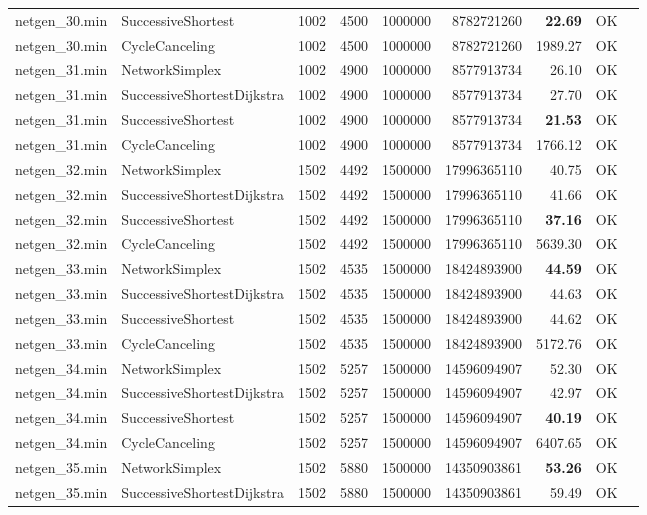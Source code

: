 \begin{longtable}{llrrrrrrl}
netgen\_30.min & SuccessiveShortest & 1002 & 4500 & 1000000 & 8782721260 & \textbf{22.69} & OK \\
netgen\_30.min & CycleCanceling & 1002 & 4500 & 1000000 & 8782721260 & 1989.27 & OK \\
\midrule
netgen\_31.min & NetworkSimplex & 1002 & 4900 & 1000000 & 8577913734 & 26.10 & OK \\
netgen\_31.min & SuccessiveShortestDijkstra & 1002 & 4900 & 1000000 & 8577913734 & 27.70 & OK \\
netgen\_31.min & SuccessiveShortest & 1002 & 4900 & 1000000 & 8577913734 & \textbf{21.53} & OK \\
netgen\_31.min & CycleCanceling & 1002 & 4900 & 1000000 & 8577913734 & 1766.12 & OK \\
\midrule
netgen\_32.min & NetworkSimplex & 1502 & 4492 & 1500000 & 17996365110 & 40.75 & OK \\
netgen\_32.min & SuccessiveShortestDijkstra & 1502 & 4492 & 1500000 & 17996365110 & 41.66 & OK \\
netgen\_32.min & SuccessiveShortest & 1502 & 4492 & 1500000 & 17996365110 & \textbf{37.16} & OK \\
netgen\_32.min & CycleCanceling & 1502 & 4492 & 1500000 & 17996365110 & 5639.30 & OK \\
\midrule
netgen\_33.min & NetworkSimplex & 1502 & 4535 & 1500000 & 18424893900 & \textbf{44.59} & OK \\
netgen\_33.min & SuccessiveShortestDijkstra & 1502 & 4535 & 1500000 & 18424893900 & 44.63 & OK \\
netgen\_33.min & SuccessiveShortest & 1502 & 4535 & 1500000 & 18424893900 & 44.62 & OK \\
netgen\_33.min & CycleCanceling & 1502 & 4535 & 1500000 & 18424893900 & 5172.76 & OK \\
\midrule
netgen\_34.min & NetworkSimplex & 1502 & 5257 & 1500000 & 14596094907 & 52.30 & OK \\
netgen\_34.min & SuccessiveShortestDijkstra & 1502 & 5257 & 1500000 & 14596094907 & 42.97 & OK \\
netgen\_34.min & SuccessiveShortest & 1502 & 5257 & 1500000 & 14596094907 & \textbf{40.19} & OK \\
netgen\_34.min & CycleCanceling & 1502 & 5257 & 1500000 & 14596094907 & 6407.65 & OK \\
\midrule
netgen\_35.min & NetworkSimplex & 1502 & 5880 & 1500000 & 14350903861 & \textbf{53.26} & OK \\
netgen\_35.min & SuccessiveShortestDijkstra & 1502 & 5880 & 1500000 & 14350903861 & 59.49 & OK \\

\end{longtable}
